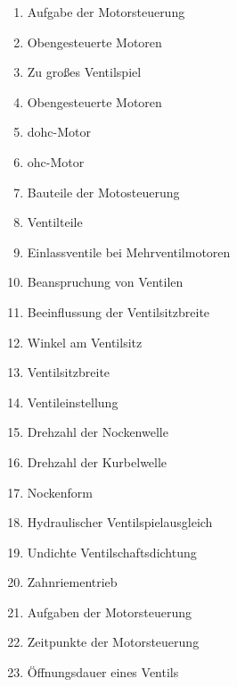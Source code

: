 \begin{enumerate}
\item
  Aufgabe der Motorsteuerung\\
\item
  Obengesteuerte Motoren\\
\item
  Zu großes Ventilspiel\\
\item
  Obengesteuerte Motoren\\
\item
  dohc-Motor\\
\item
  ohc-Motor\\
\item
  Bauteile der Motosteuerung\\
\item
  Ventilteile\\
\item
  Einlassventile bei Mehrventilmotoren\\
\item
  Beanspruchung von Ventilen\\
\item
  Beeinflussung der Ventilsitzbreite\\
\item
  Winkel am Ventilsitz\\
\item
  Ventilsitzbreite\\
\item
  Ventileinstellung\\
\item
  Drehzahl der Nockenwelle\\
\item
  Drehzahl der Kurbelwelle\\
\item
  Nockenform\\
\item
  Hydraulischer Ventilspielausgleich\\
\item
  Undichte Ventilschaftsdichtung\\
\item
  Zahnriementrieb\\
\item
  Aufgaben der Motorsteuerung\\
\item
  Zeitpunkte der Motorsteuerung\\
\item
  Öffnungsdauer eines Ventils\\

\end{enumerate}
